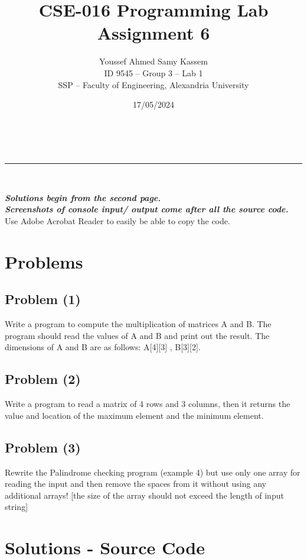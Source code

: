 \documentclass[a4paper,11pt]{article}
\makeatletter
\renewcommand\tableofcontents{%
    \section*{\makebox[\linewidth][c]{\contentsname}%
      \@mkboth{\MakeUppercase\contentsname}{\MakeUppercase\contentsname}}%
    \begin{multicols}{2}%
    \@starttoc{toc}%
    \end{multicols}
    }
\newcommand{\linia}{\rule{\linewidth}{0.5pt}}
\theoremstyle{mytheor}
\theoremstyle{mytheor}
\renewcommand{\maketitle}{
\begin{center}
\vspace{2ex}
{\huge \textsf{\textbf{\@title}}}
\vspace{1ex}
\\
\linia\\
\textsf{\@date \hfill
\@author}
\vspace{4ex}
\end{center}
}
\makeatother
\begin{document}
\title{CSE-016 Programming Lab Assignment \textnumero{} 6}

\date{17/05/2024}

\author{Youssef Ahmed Samy Kassem\\ \hfill ID 9545 -- Group 3 -- Lab 1\\ \hfill SSP -- Faculty of Engineering, Alexandria University\\}

\maketitle
\textsf{\textsl{\textbf{Solutions begin from the second page.\\Screenshots of console input/ output come after all the source code.}}}
\\Use Adobe Acrobat Reader to easily be able to copy the code.
\section{Problems}
\subsection{Problem (1)}
Write a program to compute the multiplication of matrices A and B. The program should read the values of A and B and print out the result. The dimensions of A and B are as follows: A[4][3] , B[3][2].
\subsection{Problem (2)}
Write a program to read a matrix of 4 rows and 3 columns, then it returns the value and location of the maximum element and the minimum element.
\subsection{Problem (3)}
Rewrite the Palindrome checking program (example 4) but use only one array for reading the input and then remove the spaces from it without using any additional arrays! [the size of the array should not exceed the length of input string]

\tableofcontents
\newpage
\section{Solutions - Source Code}
\end{document}
